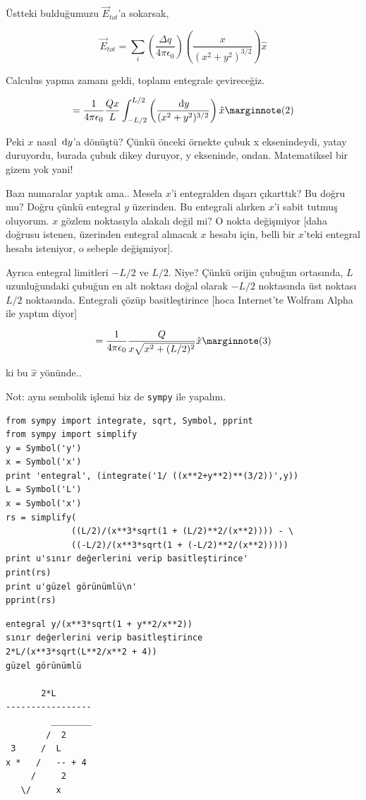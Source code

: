 \documentclass[12pt,fleqn]{article}\usepackage{../../common}
\begin{document}
Üstteki bulduğumuzu $\vec{E}_{tot}$'a sokarsak,

$$ 
\vec{E}_{tot} = \sum_i 
\left(   \frac{\Delta q}{4\pi\epsilon_0}  \right) 
  \left(\frac{x}{(x^2+y^2)^{3/2}} \right) \hat{x}
$$

Calculus yapma zamanı geldi, toplamı entegrale çevireceğiz.

$$ 
= \frac{1}{4\pi\epsilon_0} \frac{Q x}{L} \int _{-L/2}^{L/2}
\left(\frac{\ud y}{(x^2+y^2)^{3/2}} \right) \hat{x} 
\mlabel{2} 
$$

Peki $x$ nasıl $\,\mathrm{d} y$'a dönüştü? Çünkü önceki örnekte çubuk x
eksenindeydi, yatay duruyordu, burada çubuk dikey duruyor, y ekseninde,
ondan. Matematiksel bir gizem yok yani! 

Bazı numaralar yaptık ama.. Mesela $x$'i entegralden dışarı çıkarttık? Bu
doğru mu? Doğru çünkü entegral $y$ üzerinden. Bu entegrali alırken $x$'i
sabit tutmuş oluyorum. $x$ gözlem noktasıyla alakalı değil mi? O nokta
değişmiyor [daha doğrusu istenen, üzerinden entegral alınacak $x$ hesabı
için, belli bir $x$'teki entegral hesabı isteniyor, o sebeple değişmiyor]. 

Ayrıca entegral limitleri $-L/2$ ve $L/2$. Niye? Çünkü orijin çubuğun
ortasında, $L$ uzunluğundaki çubuğun en alt noktası doğal olarak $-L/2$
noktasında üst noktası $L/2$ noktasında. Entegrali çözüp basitleştirince
[hoca Internet'te Wolfram Alpha ile yaptım diyor]

$$ 
= \frac{1}{4\pi\epsilon_0} \frac{Q}{x \sqrt{x^2 + (L/2)^2}}\hat{x} 
\mlabel{3}
$$

ki bu $\hat{x}$ yönünde.. 

Not: aynı sembolik işlemi biz de \verb!sympy! ile yapalım.

\begin{verbatim}
from sympy import integrate, sqrt, Symbol, pprint
from sympy import simplify
y = Symbol('y')
x = Symbol('x')
print 'entegral', (integrate('1/ ((x**2+y**2)**(3/2))',y))
L = Symbol('L')
x = Symbol('x')
rs = simplify(
             ((L/2)/(x**3*sqrt(1 + (L/2)**2/(x**2)))) - \
             ((-L/2)/(x**3*sqrt(1 + (-L/2)**2/(x**2)))))
print u'sınır değerlerini verip basitleştirince'
print(rs)
print u'güzel görünümlü\n'
pprint(rs)
\end{verbatim}

\begin{verbatim}
entegral y/(x**3*sqrt(1 + y**2/x**2))
sınır değerlerini verip basitleştirince
2*L/(x**3*sqrt(L**2/x**2 + 4))
güzel görünümlü

       2*L       
-----------------
         ________
        /  2     
 3     /  L      
x *   /   -- + 4 
     /     2     
   \/     x      
\end{verbatim}
\end{document}
